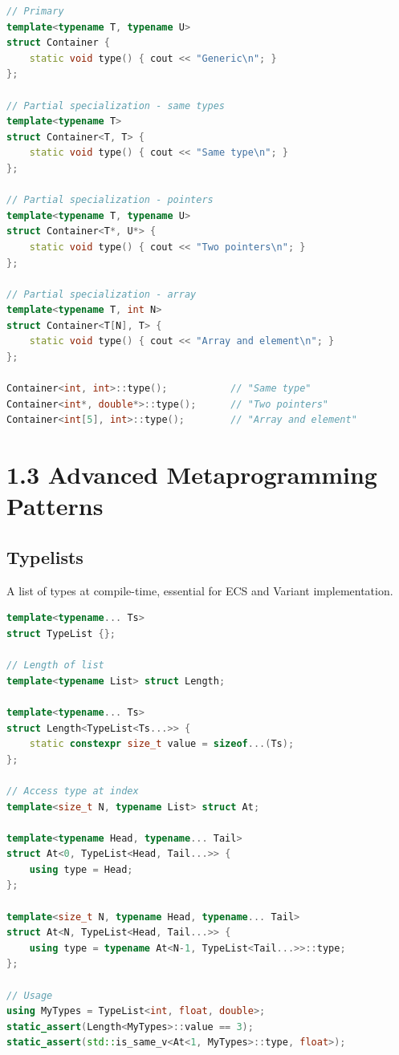 \begin{lstlisting}[language={C++}]
// Primary
template<typename T, typename U>
struct Container {
    static void type() { cout << "Generic\n"; }
};

// Partial specialization - same types
template<typename T>
struct Container<T, T> {
    static void type() { cout << "Same type\n"; }
};

// Partial specialization - pointers
template<typename T, typename U>
struct Container<T*, U*> {
    static void type() { cout << "Two pointers\n"; }
};

// Partial specialization - array
template<typename T, int N>
struct Container<T[N], T> {
    static void type() { cout << "Array and element\n"; }
};

Container<int, int>::type();           // "Same type"
Container<int*, double*>::type();      // "Two pointers"
Container<int[5], int>::type();        // "Array and element"
\end{lstlisting}

\hypertarget{advanced-metaprogramming-patterns}{%
\section{1.3 Advanced Metaprogramming
Patterns}\label{advanced-metaprogramming-patterns}}

\hypertarget{typelists}{%
\subsection{Typelists}\label{typelists}}

A list of types at compile-time, essential for ECS and Variant
implementation.

\begin{lstlisting}[language={C++}]
template<typename... Ts>
struct TypeList {};

// Length of list
template<typename List> struct Length;

template<typename... Ts>
struct Length<TypeList<Ts...>> {
    static constexpr size_t value = sizeof...(Ts);
};

// Access type at index
template<size_t N, typename List> struct At;

template<typename Head, typename... Tail>
struct At<0, TypeList<Head, Tail...>> {
    using type = Head;
};

template<size_t N, typename Head, typename... Tail>
struct At<N, TypeList<Head, Tail...>> {
    using type = typename At<N-1, TypeList<Tail...>>::type;
};

// Usage
using MyTypes = TypeList<int, float, double>;
static_assert(Length<MyTypes>::value == 3);
static_assert(std::is_same_v<At<1, MyTypes>::type, float>);
\end{lstlisting}

